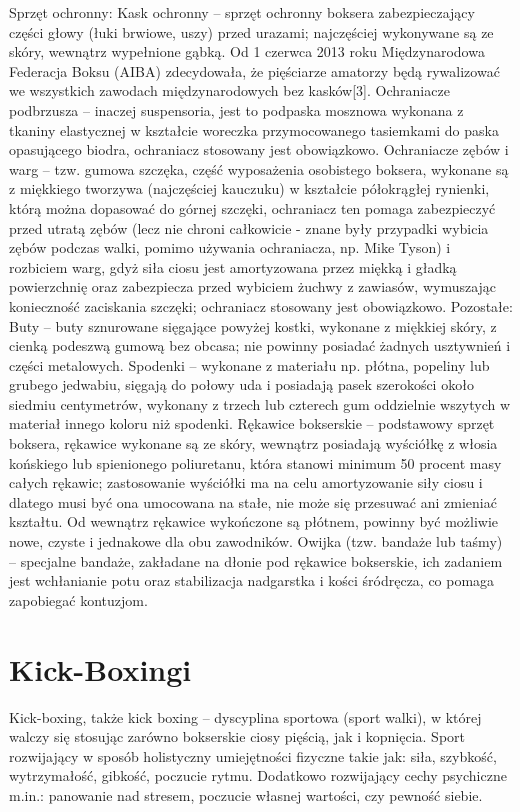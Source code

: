 \documentclass[14pt,oneside,a4paper]{book}
\theoremstyle{break}
\begin{document}
Sprzęt ochronny:
Kask ochronny – sprzęt ochronny boksera zabezpieczający części głowy (łuki brwiowe, uszy) przed urazami; najczęściej wykonywane są ze skóry, wewnątrz wypełnione gąbką. Od 1 czerwca 2013 roku Międzynarodowa Federacja Boksu (AIBA) zdecydowała, że pięściarze amatorzy będą rywalizować we wszystkich zawodach międzynarodowych bez kasków[3].
Ochraniacze podbrzusza – inaczej suspensoria, jest to podpaska mosznowa wykonana z tkaniny elastycznej w kształcie woreczka przymocowanego tasiemkami do paska opasującego biodra, ochraniacz stosowany jest obowiązkowo.
Ochraniacze zębów i warg – tzw. gumowa szczęka, część wyposażenia osobistego boksera, wykonane są z miękkiego tworzywa (najczęściej kauczuku) w kształcie półokrągłej rynienki, którą można dopasować do górnej szczęki, ochraniacz ten pomaga zabezpieczyć przed utratą zębów (lecz nie chroni całkowicie - znane były przypadki wybicia zębów podczas walki, pomimo używania ochraniacza, np. Mike Tyson) i rozbiciem warg, gdyż siła ciosu jest amortyzowana przez miękką i gładką powierzchnię oraz zabezpiecza przed wybiciem żuchwy z zawiasów, wymuszając konieczność zaciskania szczęki; ochraniacz stosowany jest obowiązkowo.
Pozostałe:
Buty – buty sznurowane sięgające powyżej kostki, wykonane z miękkiej skóry, z cienką podeszwą gumową bez obcasa; nie powinny posiadać żadnych usztywnień i części metalowych.
Spodenki – wykonane z materiału np. płótna, popeliny lub grubego jedwabiu, sięgają do połowy uda i posiadają pasek szerokości około siedmiu centymetrów, wykonany z trzech lub czterech gum oddzielnie wszytych w materiał innego koloru niż spodenki.
Rękawice bokserskie – podstawowy sprzęt boksera, rękawice wykonane są ze skóry, wewnątrz posiadają wyściółkę z włosia końskiego lub spienionego poliuretanu, która stanowi minimum 50 procent masy całych rękawic; zastosowanie wyściółki ma na celu amortyzowanie siły ciosu i dlatego musi być ona umocowana na stałe, nie może się przesuwać ani zmieniać kształtu. Od wewnątrz rękawice wykończone są płótnem, powinny być możliwie nowe, czyste i jednakowe dla obu zawodników.
Owijka (tzw. bandaże lub taśmy) – specjalne bandaże, zakładane na dłonie pod rękawice bokserskie, ich zadaniem jest wchłanianie potu oraz stabilizacja nadgarstka i kości śródręcza, co pomaga zapobiegać kontuzjom.


\pagestyle{fancy}


\chapter {Kick-Boxingi}
Kick-boxing, także kick boxing – dyscyplina sportowa (sport walki), w której walczy się stosując zarówno bokserskie ciosy pięścią, jak i kopnięcia. Sport rozwijający w sposób holistyczny umiejętności fizyczne takie jak: siła, szybkość, wytrzymałość, gibkość, poczucie rytmu. Dodatkowo rozwijający cechy psychiczne m.in.: panowanie nad stresem, poczucie własnej wartości, czy pewność siebie.
\end{document}
